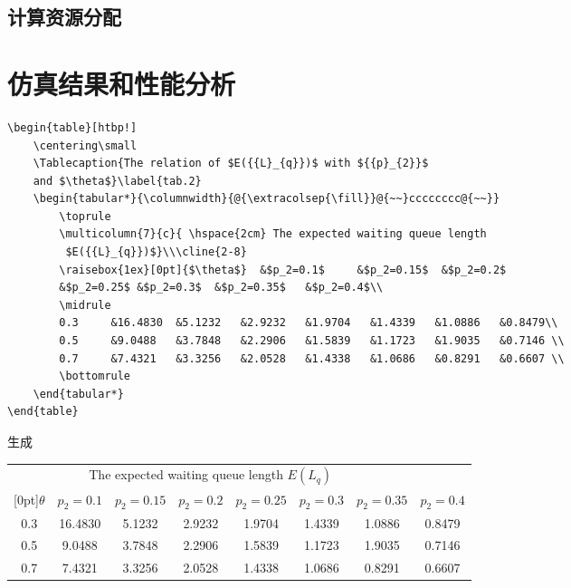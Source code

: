 \subsection{计算资源分配}\label{section3-3-4}

\section{仿真结果和性能分析}\label{section3-4}
\begin{verbatim}
\begin{table}[htbp!]
	\centering\small
	\Tablecaption{The relation of $E({{L}_{q}})$ with ${{p}_{2}}$
    and $\theta$}\label{tab.2}
	\begin{tabular*}{\columnwidth}{@{\extracolsep{\fill}}@{~~}cccccccc@{~~}}
		\toprule
		\multicolumn{7}{c}{ \hspace{2cm} The expected waiting queue length
         $E({{L}_{q}})$}\\\cline{2-8}
		\raisebox{1ex}[0pt]{$\theta$}  &$p_2=0.1$     &$p_2=0.15$  &$p_2=0.2$
        &$p_2=0.25$ &$p_2=0.3$  &$p_2=0.35$   &$p_2=0.4$\\
		\midrule
		0.3     &16.4830  &5.1232   &2.9232   &1.9704   &1.4339   &1.0886   &0.8479\\
		0.5     &9.0488   &3.7848   &2.2906   &1.5839   &1.1723   &1.9035   &0.7146 \\
		0.7     &7.4321   &3.3256   &2.0528   &1.4338   &1.0686   &0.8291   &0.6607 \\
		\bottomrule
	\end{tabular*}	
\end{table}
\end{verbatim}
生成
\begin{table}[htbp!]
	\centering\small
	\label{tab.2}
	\begin{tabular*}{\columnwidth}{@{\extracolsep{\fill}}@{~~}cccccccc@{~~}}
		\toprule
		\multicolumn{7}{c}{ \hspace{2cm} The expected waiting queue length $E({{L}_{q}})$}\\
		\cline{2-8}
		\raisebox{1ex}[0pt]{$\theta$}  &$p_2=0.1$     &$p_2=0.15$  &$p_2=0.2$   &$p_2=0.25$
        &$p_2=0.3$  &$p_2=0.35$   &$p_2=0.4$\\
		\midrule
		0.3     &16.4830  &5.1232   &2.9232   &1.9704   &1.4339   &1.0886   &0.8479\\
		0.5     &9.0488   &3.7848   &2.2906   &1.5839   &1.1723   &1.9035   &0.7146 \\
		0.7     &7.4321   &3.3256   &2.0528   &1.4338   &1.0686   &0.8291   &0.6607 \\
		\bottomrule
	\end{tabular*}	
\end{table}

